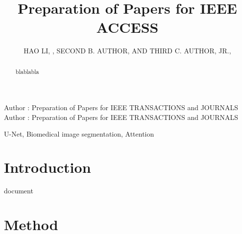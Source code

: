 \documentclass{ieeeaccess}
\begin{document}

\title{Preparation of Papers for IEEE ACCESS}
\author{\uppercase{Hao Li}, ,
\uppercase{Second B. Author, and Third C. Author,
Jr}.,
}
\address[1]{Beijing University of chemical and technology, Beijing, 10029 China (e-mail: 2018040206@mail.buct.edu.cn)}
\address[2]{Department of Physics, Colorado State University, Fort Collins, 
CO 80523 USA (e-mail: author@lamar.colostate.edu)}
\address[3]{Electrical Engineering Department, University of Colorado, Boulder, CO 
80309 USA}

\markboth
{Author \headeretal: Preparation of Papers for IEEE TRANSACTIONS and JOURNALS}
{Author \headeretal: Preparation of Papers for IEEE TRANSACTIONS and JOURNALS}


\begin{abstract}
blablabla
\end{abstract}

\begin{keywords}
U-Net, Biomedical image segmentation, Attention
\end{keywords}

\titlepgskip=-15pt

\maketitle

\section{Introduction}
\label{sec:introduction}
 document 

\section{Method}
\end{document}
